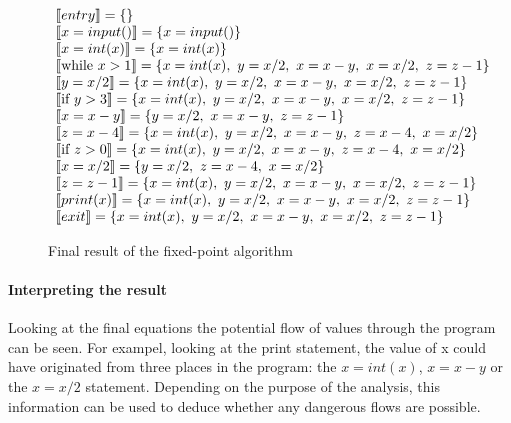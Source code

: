 \begin{figure}[H]
\[
\begin{array}{l}
  \llbracket entry \rrbracket = \{\}\\
  \llbracket x = input() \rrbracket = \{x = input()\}\\
  \llbracket x = int(x) \rrbracket = \{x = int(x)\}\\
  \llbracket \text{while } x > 1 \rrbracket = \{ x = int(x), ~ y = x / 2, ~ x=x-y, ~ x = x/2, ~ z=z-1 \}\\
  \llbracket  y = x / 2 \rrbracket =  \{ x = int(x), ~ y = x / 2, ~ x=x-y, ~ x = x/2, ~ z=z-1 \}\\
  \llbracket \text{if } y > 3 \rrbracket =  \{ x = int(x), ~ y = x / 2, ~ x=x-y, ~ x = x/2, ~ z=z-1 \}\\
  \llbracket  x = x-y \rrbracket =  \{ y = x / 2, ~ x=x-y, ~ z=z-1 \}\\
  \llbracket  z = x-4 \rrbracket =  \{ x = int(x), ~ y = x / 2, ~ x=x-y, ~ z=x-4, ~ x = x/2\}\\
  \llbracket \text{if } z > 0 \rrbracket = \{ x = int(x), ~ y = x / 2, ~ x=x-y, ~ z=x-4, ~ x = x/2\}\\
  \llbracket x = x / 2 \rrbracket = \{ y = x / 2, ~ z=x-4, ~ x = x/2\}\\
  \llbracket z = z - 1 \rrbracket = \{ x = int(x), ~ y = x / 2, ~ x=x-y, ~ x = x/2, ~ z=z-1 \}\\
  \llbracket print(x) \rrbracket = \{ x = int(x), ~ y = x / 2, ~ x=x-y, ~ x = x/2, ~ z=z-1 \}\\
  \llbracket exit \rrbracket = \{ x = int(x), ~ y = x / 2, ~ x=x-y, ~ x = x/2, ~ z=z-1 \}\\
\end{array}
\]
\caption{Final result of the fixed-point algorithm}
\label{reachingdefinitions:finaliteration}
\end{figure}

\paragraph{Interpreting the result}

Looking at the final equations the potential flow of values through the program can be seen.
For exampel, looking at the print statement, the value of x could have originated from three places in the program: the $x = int(x)$, $x = x-y$ or the $x = x/2$ statement.
Depending on the purpose of the analysis, this information can be used to deduce whether any dangerous flows are possible.
